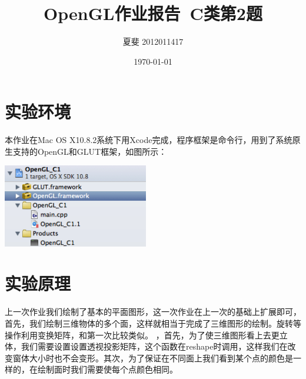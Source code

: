 \documentclass[12pt]{article}
\title{OpenGL作业报告\  C类第2题}
\author{夏斐 2012011417}
\date{\today}
\begin{document}
\maketitle
\linespread {1}
\section{实验环境}
本作业在Mac OS X10.8.2系统下用Xcode完成，程序框架是命令行，用到了系统原生支持的OpenGL和GLUT框架，如图所示：
\begin{center}
\includegraphics[width = 2.5in]{environment.png} 
\end{center}
\par
\section{实验原理}
上一次作业我们绘制了基本的平面图形，这一次作业在上一次的基础上扩展即可，首先，我们绘制三维物体的多个面，这样就相当于完成了三维图形的绘制。旋转等操作利用变换矩阵，和第一次比较类似。
，首先，为了使三维图形看上去更立体，我们需要设置设置透视投影矩阵，这个函数在reshape时调用，这样我们在改变窗体大小时也不会变形。其次，为了保证在不同面上我们看到某个点的颜色是一样的，在绘制面时我们需要使每个点颜色相同。
\end{document}
